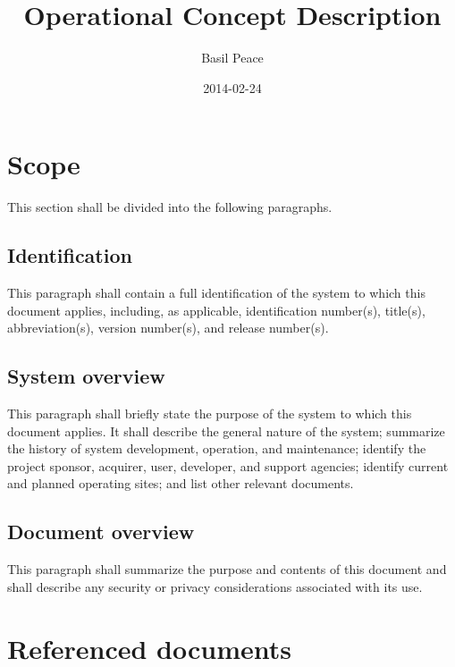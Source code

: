 \documentclass{fidata-report-template}
\begin{document}
\frontmatter

\title{Operational Concept Description}

\date{2014-02-24}

\author{Basil Peace}

\maketitle
\tableofcontents

\section{Scope}

This section shall be divided into the following paragraphs.

\subsection{Identification}

This paragraph shall contain a full identification of the system to
which this document applies, including, as applicable, identification
number(s), title(s), abbreviation(s), version number(s), and release
number(s).

\subsection{System overview}

This paragraph shall briefly state the purpose of the system to which
this document applies. It shall describe the general nature of the
system; summarize the history of system development, operation, and
maintenance; identify the project sponsor, acquirer, user, developer,
and support agencies; identify current and planned operating sites; and
list other relevant documents.

\subsection{Document overview}

This paragraph shall summarize the purpose and contents of this document
and shall describe any security or privacy considerations associated
with its use.

\section{Referenced documents}
\end{document}
